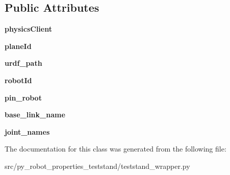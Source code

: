 \subsection*{Public Attributes}
\begin{DoxyCompactItemize}
\item 
{\bfseries physics\+Client}\hypertarget{classpy__robot__properties__teststand_1_1teststand__wrapper_1_1TeststandRobot_aa4437ff4d8945c315421b5e70d3af601}{}\label{classpy__robot__properties__teststand_1_1teststand__wrapper_1_1TeststandRobot_aa4437ff4d8945c315421b5e70d3af601}

\item 
{\bfseries plane\+Id}\hypertarget{classpy__robot__properties__teststand_1_1teststand__wrapper_1_1TeststandRobot_a04fb410e4674695ce47958757348194f}{}\label{classpy__robot__properties__teststand_1_1teststand__wrapper_1_1TeststandRobot_a04fb410e4674695ce47958757348194f}

\item 
{\bfseries urdf\+\_\+path}\hypertarget{classpy__robot__properties__teststand_1_1teststand__wrapper_1_1TeststandRobot_aec6a5a48a83dca0dd1b47c7ab368ceeb}{}\label{classpy__robot__properties__teststand_1_1teststand__wrapper_1_1TeststandRobot_aec6a5a48a83dca0dd1b47c7ab368ceeb}

\item 
{\bfseries robot\+Id}\hypertarget{classpy__robot__properties__teststand_1_1teststand__wrapper_1_1TeststandRobot_a658e7fb26e593dde178f3d493fe56983}{}\label{classpy__robot__properties__teststand_1_1teststand__wrapper_1_1TeststandRobot_a658e7fb26e593dde178f3d493fe56983}

\item 
{\bfseries pin\+\_\+robot}\hypertarget{classpy__robot__properties__teststand_1_1teststand__wrapper_1_1TeststandRobot_a5a36d31d24a80328cd648b6e3fa21888}{}\label{classpy__robot__properties__teststand_1_1teststand__wrapper_1_1TeststandRobot_a5a36d31d24a80328cd648b6e3fa21888}

\item 
{\bfseries base\+\_\+link\+\_\+name}\hypertarget{classpy__robot__properties__teststand_1_1teststand__wrapper_1_1TeststandRobot_a5b1f744786d19f37a6c5d271678f3c3d}{}\label{classpy__robot__properties__teststand_1_1teststand__wrapper_1_1TeststandRobot_a5b1f744786d19f37a6c5d271678f3c3d}

\item 
{\bfseries joint\+\_\+names}\hypertarget{classpy__robot__properties__teststand_1_1teststand__wrapper_1_1TeststandRobot_a59a42e2e276864865bd7052cc8ca10b5}{}\label{classpy__robot__properties__teststand_1_1teststand__wrapper_1_1TeststandRobot_a59a42e2e276864865bd7052cc8ca10b5}

\end{DoxyCompactItemize}


The documentation for this class was generated from the following file\+:\begin{DoxyCompactItemize}
\item 
src/py\+\_\+robot\+\_\+properties\+\_\+teststand/teststand\+\_\+wrapper.\+py\end{DoxyCompactItemize}
